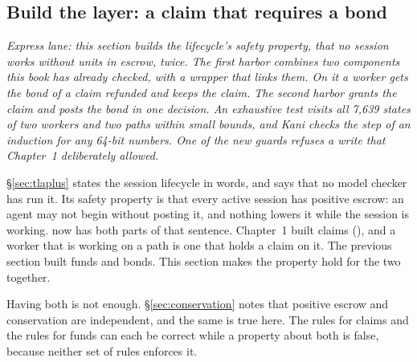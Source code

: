 %
%
\subsection{Build the layer: a claim that requires a bond}
\label{sec:bonded-stake}

\noindent\emph{Express lane: this section builds the lifecycle's safety
property, that no session works without units in escrow, twice. The first
harbor combines two components this book has already checked, with a
wrapper that links them. On it a worker gets the bond of a claim refunded
and keeps the claim. The second harbor grants the claim and posts the bond
in one decision. An exhaustive test visits all 7,639 states of two workers
and two paths within small bounds, and Kani checks the step of an
induction for any 64-bit numbers. One of the new guards refuses a write
that Chapter~1 deliberately allowed.}

\S\ref{sec:tlaplus} states the session lifecycle in words, and says that no
model checker has run it. Its safety property is that every active session
has positive escrow: an agent may not begin without posting it, and
nothing lowers it while the session is working. \pdkernelname{} now has
both parts of that sentence. Chapter~1 built claims
(), and a worker that is working on a path
is one that holds a claim on it. The previous section built funds and
bonds. This section makes the property hold for the two together.

Having both is not enough. \S\ref{sec:conservation} notes that positive
escrow and conservation are independent, and the same is true here. The
rules for claims and the rules for funds can each be correct while a
property about both is false, because neither set of rules enforces it.


